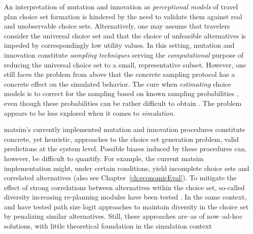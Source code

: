 An interpretation of mutation and innovation as \emph{perceptional models} of
travel plan choice set formation is hindered by the need to validate them
against real and unobservable
choice sets.
Alternatively, one may assume that travelers consider the universal choice set
and that the choice of unfeasible alternatives is impeded by correspondingly low
utility values. In this setting, mutation and innovation constitute
\emph{sampling techniques} serving the \emph{computational} purpose of reducing
the universal choice set to a small, representative subset.
%
However, one still faces the problem from above that the concrete sampling
protocol has a concrete effect on the simulated behavior. The cure when
\emph{estimating} choice models is to correct for the sampling based on known
sampling probabilities \citep[e.g.][Chapter 9]{BenAkivaLerman_1985}, even though
these probabilities can be rather difficult to obtain \citep{floetteroed-2012b,
frejinger-2009}. The problem appears to be  less explored when it
comes to \emph{simulation}.

\gls{matsim}'s currently implemented mutation and innovation procedures
constitute concrete, yet heuristic, approaches to the choice set generation
problem,  valid predictions at the system level.
Possible biases induced by these procedures can, however, be difficult to
quantify.
For example, the current \gls{matsim} implementation might, under certain
conditions, yield incomplete choice sets and correlated alternatives (also see
Chapter~\ref{ch:economicEval}).
To mitigate the effect of strong correlations between alternatives within the
choice set, so-called diversity increasing re-planning modules have been tested
\citep[see, e.g.,][]{NagelKickhoeferJoubert2014HeterogeneousVoTsPROCEDIA}. In
the same context, \citet[][Chapter~6]{Grether_PhDThesis_2014} and
\cite{NeumannEtAlPassengerArrivalPatterns} have tested path size logit
approaches \citep[see,
e.g.,][]{DaganzoSheffi_TransScience_1977,FrejingerBierlaire_TransResB_2007} to
maintain diversity in the choice set by penalizing similar alternatives.
Still, these approaches are--as of now--ad-hoc solutions, with little
theoretical foundation in the simulation context

